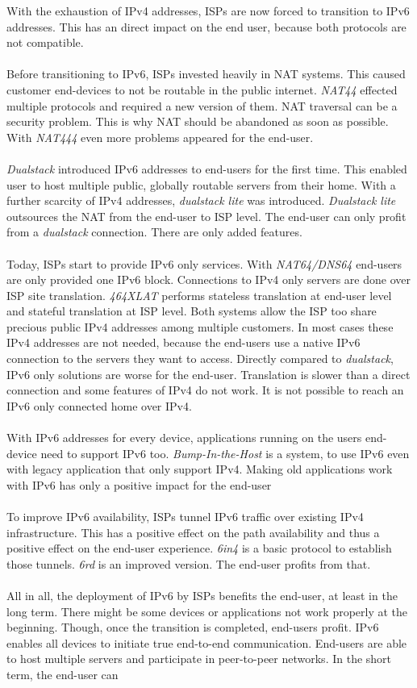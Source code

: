 \documentclass[format=sigconf, natbib=true, nonacm=true]{acmart}
\begin{document}
    With the exhaustion of IPv4 addresses, ISPs are now forced to transition to IPv6 addresses. This has an direct impact on the end user, because both protocols are not compatible.\\\\Before transitioning to IPv6, ISPs invested heavily in NAT systems. This caused customer end-devices to not be routable in the public internet. \textit{NAT44} effected multiple protocols and required a new version of them. NAT traversal can be a security problem. This is why NAT should be abandoned as soon as possible. With \textit{NAT444} even more problems appeared for the end-user.\\\\\textit{Dualstack} introduced IPv6 addresses to end-users for the first time. This enabled user to host multiple public, globally routable servers from their home. With a further scarcity of IPv4 addresses, \textit{dualstack lite} was introduced. \textit{Dualstack lite} outsources the NAT from the end-user to ISP level. The end-user can only profit from a \textit{dualstack} connection. There are only added features.\\\\Today, ISPs start to provide IPv6 only services. With \textit{NAT64/DNS64} end-users are only provided one IPv6 block. Connections to IPv4 only servers are done over ISP site translation. \textit{464XLAT} performs stateless translation at end-user level and stateful translation at ISP level. Both systems allow the ISP too share precious public IPv4 addresses among multiple customers. In most cases these IPv4 addresses are not needed, because the end-users use a native IPv6 connection to the servers they want to access. Directly compared to \textit{dualstack}, IPv6 only solutions are worse for the end-user. Translation is slower than a direct connection and some features of IPv4 do not work. It is not possible to reach an IPv6 only connected home over IPv4.\\\\With IPv6 addresses for every device, applications running on the users end-device need to support IPv6 too. \textit{Bump-In-the-Host} is a system, to use IPv6 even with legacy application that only support IPv4. Making old applications work with IPv6 has only a positive impact for the end-user\\\\To improve IPv6 availability, ISPs tunnel IPv6 traffic over existing IPv4 infrastructure. This has a positive effect on the path availability and thus a positive effect on the end-user experience. \textit{6in4} is a basic protocol to establish those tunnels. \textit{6rd} is an improved version. The end-user profits from that.\\\\All in all, the deployment of IPv6 by ISPs benefits the end-user, at least in the long term. There might be some devices or applications not work properly at the beginning. Though, once the transition is completed, end-users profit. IPv6 enables all devices to initiate true end-to-end communication. End-users are able to host multiple servers and participate in peer-to-peer networks. In the short term, the end-user can 
\end{document}
